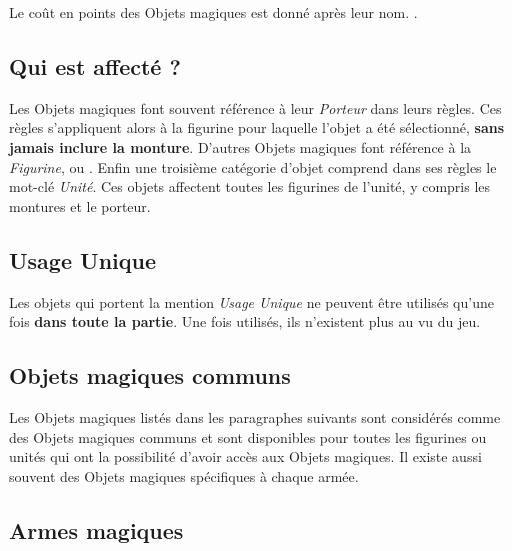 Le coût en points des Objets magiques est donné après leur nom. .

\subsection{Qui est affecté ?}

Les Objets magiques font souvent référence à leur \emph{Porteur} dans leurs règles. Ces règles s'appliquent alors à la figurine pour laquelle l'objet a été sélectionné, \textbf{sans jamais inclure la monture}. D'autres Objets magiques font référence à la \emph{Figurine}, ou . Enfin une troisième catégorie d'objet comprend dans ses règles le mot-clé \emph{Unité}. Ces objets affectent toutes les figurines de l'unité, y compris les montures et le porteur.

\subsection{Usage Unique}

Les objets qui portent la mention \emph{Usage Unique} ne peuvent être utilisés qu'une fois \textbf{dans toute la partie}. Une fois utilisés, ils n'existent plus au vu du jeu.


\subsection{Objets magiques communs}

Les Objets magiques listés dans les paragraphes suivants sont considérés comme des Objets magiques communs et sont disponibles pour toutes les figurines ou unités qui ont la possibilité d'avoir accès aux Objets magiques. Il existe aussi souvent des Objets magiques spécifiques à chaque armée.

\newpage

\subsection{Armes magiques}

